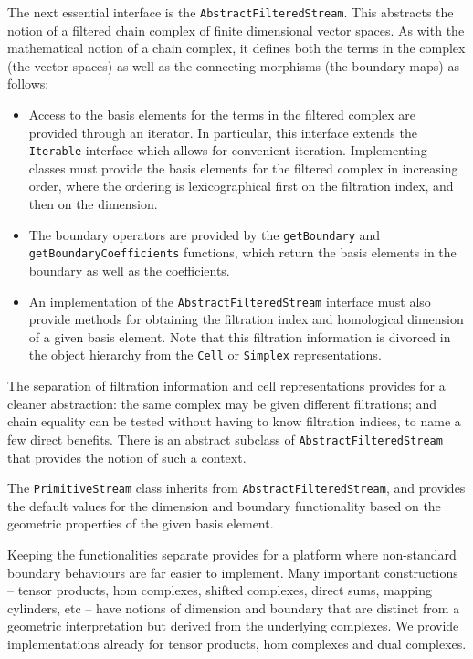 \documentclass[11pt]{amsart}
\begin{document}
The next essential interface is the  \texttt{AbstractFilteredStream}. This abstracts the notion of a filtered chain complex of finite dimensional vector spaces. As with the mathematical notion of a chain complex, it defines both the terms in the complex (the vector spaces) as well as the connecting morphisms (the boundary maps) as follows:

\begin{itemize}
\item Access to the basis elements for the terms in the filtered complex are provided through an iterator. In particular, this interface extends the  \texttt{Iterable} interface which allows for convenient iteration. Implementing classes must provide the basis elements for the filtered complex in increasing order, where the ordering is lexicographical first on the filtration index, and then on the dimension.
\item The boundary operators are provided by the  \texttt{getBoundary} and  \texttt{getBoundaryCoefficients} functions, which return the basis elements in the boundary as well as the coefficients.
\item An implementation of the  \texttt{AbstractFilteredStream} interface must also provide methods for obtaining the filtration index and homological dimension of a given basis element. Note that this filtration information is divorced in the object hierarchy from the \texttt{Cell} or \texttt{Simplex} representations.
\end{itemize}

The separation of filtration information and cell representations provides for a cleaner abstraction: the same complex may be given different filtrations; and chain equality can be tested without having to know filtration indices, to name a few direct benefits. There is an abstract subclass of \texttt{AbstractFilteredStream} that provides the notion of such a context.

The  \texttt{PrimitiveStream} class inherits from  \texttt{AbstractFilteredStream}, and provides the default values for the dimension and boundary functionality based on the geometric properties of the given basis element.

Keeping the functionalities separate provides for a platform where non-standard boundary behaviours are far easier to implement. Many important constructions -- tensor products, hom complexes, shifted complexes, direct sums, mapping cylinders, etc -- have notions of dimension and boundary that are distinct from a geometric interpretation but derived from the underlying complexes. We provide implementations already for tensor products, hom complexes and dual complexes.
\end{document}
